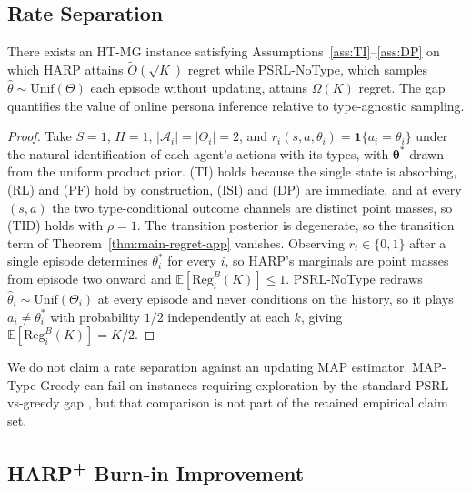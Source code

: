 \subsection{Rate Separation}
\label{app:rate-separation}
\label{sec:rate-separation}

\begin{theorem}
\label{thm:rate-separation}
There exists an HT-MG instance satisfying Assumptions~\ref{ass:TI}--\ref{ass:DP} on which HARP attains $\tilde O(\sqrt K)$ regret while PSRL-NoType, which samples $\hat\theta\sim\mathrm{Unif}(\Theta)$ each episode without updating, attains $\Omega(K)$ regret. The gap quantifies the value of online persona inference relative to type-agnostic sampling.
\end{theorem}

\begin{proof}
Take $S=1$, $H=1$, $|\mathcal A_i|=|\Theta_i|=2$, and $r_i(s,a,\theta_i)=\mathbf 1\{a_i=\theta_i\}$ under the natural identification of each agent's actions with its types, with $\boldsymbol\theta^*$ drawn from the uniform product prior. (TI) holds because the single state is absorbing, (RL) and (PF) hold by construction, (ISI) and (DP) are immediate, and at every $(s,a)$ the two type-conditional outcome channels are distinct point masses, so (TID) holds with $\rho=1$. The transition posterior is degenerate, so the transition term of Theorem~\ref{thm:main-regret-app} vanishes. Observing $r_i\in\{0,1\}$ after a single episode determines $\theta_i^*$ for every $i$, so HARP's marginals are point masses from episode two onward and $\mathbb{E}[\mathrm{Reg}_i^B(K)]\le1$. PSRL-NoType redraws $\hat\theta_i\sim\mathrm{Unif}(\Theta_i)$ at every episode and never conditions on the history, so it plays $a_i\neq\theta_i^*$ with probability $1/2$ independently at each $k$, giving $\mathbb{E}[\mathrm{Reg}_i^B(K)]=K/2$.
\end{proof}

\begin{remark}[Scope]
\label{rem:rate-sep-scope}
We do not claim a rate separation against an updating MAP estimator. MAP-Type-Greedy can fail on instances requiring exploration by the standard PSRL-vs-greedy gap \citep{osband2013more}, but that comparison is not part of the retained empirical claim set.
\end{remark}

\subsection{HARP\textsuperscript{+} Burn-in Improvement}
\label{app:pact-plus}

